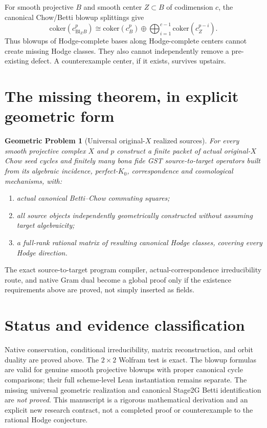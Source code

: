 \documentclass[11pt]{article}
\newcommand{\coker}{\mathrm{coker}}
\newtheorem{problem}[theorem]{Geometric Problem}
\begin{document}
For smooth projective $B$ and smooth center
$Z\subset B$ of codimension $c$,
the canonical Chow/Betti blowup splittings give
\[
 \coker(c^p_{\mathrm{Bl}_ZB})
 \cong \coker(c_B^p)
 \oplus\bigoplus_{i=1}^{c-1}\coker(c_Z^{p-i}).
\]
Thus blowups of Hodge-complete bases along
Hodge-complete centers cannot create missing
Hodge classes. They also cannot independently
remove a pre-existing defect. A counterexample
center, if it exists, survives upstairs.

\section{The missing theorem, in explicit geometric form}
\begin{problem}[Universal original-$X$ realized sources]
For every smooth projective complex $X$ and $p$
construct a finite packet of actual original-$X$
Chow seed cycles and finitely many bona fide
GST source-to-target operators built from its
algebraic incidence, perfect-$K_0$, correspondence
and cosmological mechanisms, with:
\begin{enumerate}
\item actual canonical Betti--Chow commuting squares;
\item all source objects independently geometrically
constructed without assuming target algebraicity;
\item a full-rank rational matrix of resulting
canonical Hodge classes, covering every Hodge direction.
\end{enumerate}
\end{problem}
The exact source-to-target program compiler,
actual-correspondence irreducibility route,
and native Gram dual become a global proof
only if the existence requirements above
are proved, not simply inserted as fields.
\section{Status and evidence classification}
Native conservation, conditional irreducibility,
matrix reconstruction, and orbit duality are
proved above. The $2\times2$ Wolfram test is exact.
The blowup formulas are valid for genuine
smooth projective blowups with proper canonical
cycle comparisons; their full scheme-level Lean
instantiation remains separate.
The missing universal geometric realization
and canonical Stage2G Betti identification
are \emph{not proved}. This manuscript is a
rigorous mathematical derivation and an explicit
new research contract, not a completed proof
or counterexample to the rational Hodge conjecture.
\end{document}
